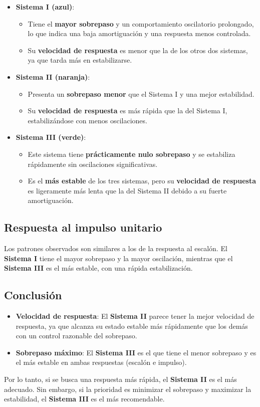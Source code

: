 \documentclass[10pt]{article}
\theoremstyle{definition}
\theoremstyle{remark}
\theoremstyle{definition}
\numberwithin{equation}{prob}
\begin{document}
\begin{itemize}
	\item \textbf{Sistema I (azul)}:
	      \begin{itemize}
		      \item Tiene el \textbf{mayor sobrepaso} y un comportamiento oscilatorio prolongado, lo que indica una baja amortiguación y una respuesta menos controlada.
		      \item Su \textbf{velocidad de respuesta} es menor que la de los otros dos sistemas, ya que tarda más en estabilizarse.
	      \end{itemize}
	\item \textbf{Sistema II (naranja)}:
	      \begin{itemize}
		      \item Presenta un \textbf{sobrepaso menor} que el Sistema I y una mejor estabilidad.
		      \item Su \textbf{velocidad de respuesta} es más rápida que la del Sistema I, estabilizándose con menos oscilaciones.
	      \end{itemize}
	\item \textbf{Sistema III (verde)}:
	      \begin{itemize}
		      \item Este sistema tiene \textbf{prácticamente nulo sobrepaso} y se estabiliza rápidamente sin oscilaciones significativas.
		      \item Es el \textbf{más estable} de los tres sistemas, pero su \textbf{velocidad de respuesta} es ligeramente más lenta que la del Sistema II debido a su fuerte amortiguación.
	      \end{itemize}
\end{itemize}

\subsection{Respuesta al impulso unitario}

Los patrones observados son similares a los de la respuesta al escalón. El \textbf{Sistema I} tiene el mayor sobrepaso y la mayor oscilación, mientras que el \textbf{Sistema III} es el más estable, con una rápida estabilización.

\subsection{Conclusión}

\begin{itemize}
	\item \textbf{Velocidad de respuesta}: El \textbf{Sistema II} parece tener la mejor velocidad de respuesta, ya que alcanza su estado estable más rápidamente que los demás con un control razonable del sobrepaso.
	\item \textbf{Sobrepaso máximo}: El \textbf{Sistema III} es el que tiene el menor sobrepaso y es el más estable en ambas respuestas (escalón e impulso).
\end{itemize}

Por lo tanto, si se busca una respuesta más rápida, el \textbf{Sistema II} es el más adecuado. Sin embargo, si la prioridad es minimizar el sobrepaso y maximizar la estabilidad, el \textbf{Sistema III} es el más recomendable.
\end{document}
